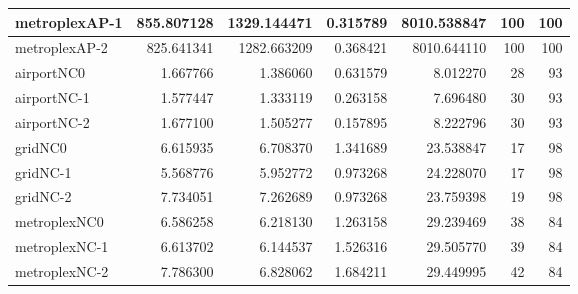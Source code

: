 \begin{longtable}{|l|r|r|r|r|r|r|}
metroplexAP-1 & 855.807128 & 1329.144471 & 0.315789 & 8010.538847 & 100 & 100 \\ \hline
metroplexAP-2 & 825.641341 & 1282.663209 & 0.368421 & 8010.644110 & 100 & 100 \\ \hline
airportNC0 & 1.667766 & 1.386060 & 0.631579 & 8.012270 & 28 & 93 \\ \hline
airportNC-1 & 1.577447 & 1.333119 & 0.263158 & 7.696480 & 30 & 93 \\ \hline
airportNC-2 & 1.677100 & 1.505277 & 0.157895 & 8.222796 & 30 & 93 \\ \hline
gridNC0 & 6.615935 & 6.708370 & 1.341689 & 23.538847 & 17 & 98 \\ \hline
gridNC-1 & 5.568776 & 5.952772 & 0.973268 & 24.228070 & 17 & 98 \\ \hline
gridNC-2 & 7.734051 & 7.262689 & 0.973268 & 23.759398 & 19 & 98 \\ \hline
metroplexNC0 & 6.586258 & 6.218130 & 1.263158 & 29.239469 & 38 & 84 \\ \hline
metroplexNC-1 & 6.613702 & 6.144537 & 1.526316 & 29.505770 & 39 & 84 \\ \hline
metroplexNC-2 & 7.786300 & 6.828062 & 1.684211 & 29.449995 & 42 & 84 \\ \hline
\end{longtable}
